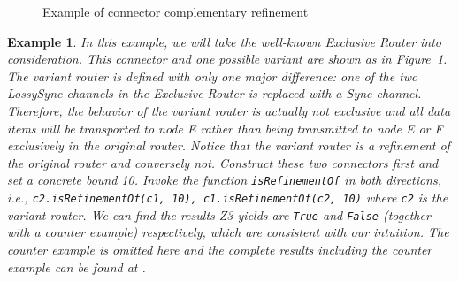 \documentclass[preprint,3p]{elsarticle}
\newtheorem{example}{Example}[section]
\begin{document}
\begin{figure}[htb]
\centering
{}
\caption{Example of connector complementary refinement }\label{fig:EXrefine}
\end{figure}
\begin{example}
In this example, we will take the well-known \emph{Exclusive Router} into consideration. This connector and one possible variant are shown as in Figure~\ref{fig:EXrefine}. The \emph{variant router} is defined with only one major difference: one of the two \emph{LossySync} channels in the Exclusive Router is replaced with a \emph{Sync} channel. Therefore, the behavior of the variant router is actually not exclusive and all data items will be transported to node \emph{E} rather than being transmitted to node \emph{E} or \emph{F} exclusively in the original router. Notice that the variant router is a refinement of the original router and conversely not. Construct these two connectors first and set a concrete bound 10. Invoke the function \texttt{isRefinementOf} in both directions, i.e., \texttt{c2.isRefinementOf(c1, 10), c1.isRefinementOf(c2, 10)} where \texttt{c2} is the variant router. We can find the results Z3 yields are \texttt{True} and \texttt{False} (together with a counter example) respectively, which are consistent with our intuition.
The counter example is omitted here and the complete results including the counter example can be found at \cite{reo2coq2Z3}.
\end{example}
\end{document}
